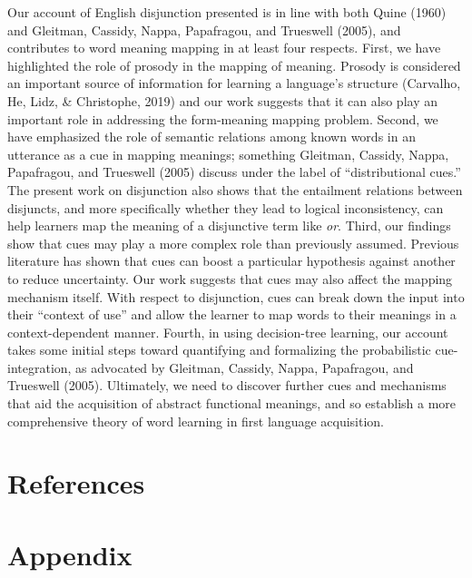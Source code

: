 \documentclass[
  english,
  ,man,floatsintext]{apa6}
\begin{document}
Our account of English disjunction presented is in line with both Quine (1960) and Gleitman, Cassidy, Nappa, Papafragou, and Trueswell (2005), and contributes to word meaning mapping in at least four respects. First, we have highlighted the role of prosody in the mapping of meaning. Prosody is considered an important source of information for learning a language's structure (Carvalho, He, Lidz, \& Christophe, 2019) and our work suggests that it can also play an important role in addressing the form-meaning mapping problem. Second, we have emphasized the role of semantic relations among known words in an utterance as a cue in mapping meanings; something Gleitman, Cassidy, Nappa, Papafragou, and Trueswell (2005) discuss under the label of ``distributional cues.'' The present work on disjunction also shows that the entailment relations between disjuncts, and more specifically whether they lead to logical inconsistency, can help learners map the meaning of a disjunctive term like \emph{or}. Third, our findings show that cues may play a more complex role than previously assumed. Previous literature has shown that cues can boost a particular hypothesis against another to reduce uncertainty. Our work suggests that cues may also affect the mapping mechanism itself. With respect to disjunction, cues can break down the input into their ``context of use'' and allow the learner to map words to their meanings in a context-dependent manner. Fourth, in using decision-tree learning, our account takes some initial steps toward quantifying and formalizing the probabilistic cue-integration, as advocated by Gleitman, Cassidy, Nappa, Papafragou, and Trueswell (2005). Ultimately, we need to discover further cues and mechanisms that aid the acquisition of abstract functional meanings, and so establish a more comprehensive theory of word learning in first language acquisition.

\newpage

\hypertarget{references}{%
\section{References}\label{references}}

\hypertarget{appendix}{%
\section{Appendix}\label{appendix}}
\end{document}
